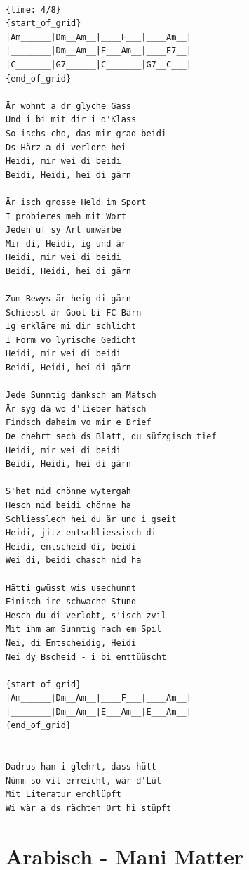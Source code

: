 \documentclass[]{book}
\let\stdsection\section
\renewcommand\section{\clearpage\stdsection}
\begin{document}
\begin{verbatim}

{time: 4/8}
{start_of_grid}
|Am______|Dm__Am__|____F___|____Am__|
|________|Dm__Am__|E___Am__|____E7__|
|C_______|G7______|C_______|G7__C___|
{end_of_grid}

Är wohnt a dr glyche Gass
Und i bi mit dir i d'Klass
So ischs cho, das mir grad beidi
Ds Härz a di verlore hei
Heidi, mir wei di beidi
Beidi, Heidi, hei di gärn

Är isch grosse Held im Sport
I probieres meh mit Wort
Jeden uf sy Art umwärbe
Mir di, Heidi, ig und är
Heidi, mir wei di beidi
Beidi, Heidi, hei di gärn

Zum Bewys är heig di gärn
Schiesst är Gool bi FC Bärn
Ig erkläre mi dir schlicht
I Form vo lyrische Gedicht
Heidi, mir wei di beidi
Beidi, Heidi, hei di gärn

Jede Sunntig dänksch am Mätsch
Är syg dä wo d'lieber hätsch
Findsch daheim vo mir e Brief
De chehrt sech ds Blatt, du süfzgisch tief
Heidi, mir wei di beidi
Beidi, Heidi, hei di gärn

S'het nid chönne wytergah
Hesch nid beidi chönne ha
Schliesslech hei du är und i gseit
Heidi, jitz entschliessisch di
Heidi, entscheid di, beidi
Wei di, beidi chasch nid ha

Hätti gwüsst wis usechunnt
Einisch ire schwache Stund
Hesch du di verlobt, s'isch zvil
Mit ihm am Sunntig nach em Spil
Nei, di Entscheidig, Heidi
Nei dy Bscheid - i bi enttüüscht

{start_of_grid}
|Am______|Dm__Am__|____F___|____Am__|
|________|Dm__Am__|E___Am__|E___Am__|
{end_of_grid}


Dadrus han i glehrt, dass hütt
Nümm so vil erreicht, wär d'Lüt
Mit Literatur erchlüpft
Wi wär a ds rächten Ort hi stüpft
\end{verbatim}

\hypertarget{arabisch---mani-matter}{%
\section{Arabisch - Mani Matter}\label{arabisch---mani-matter}}
\end{document}
